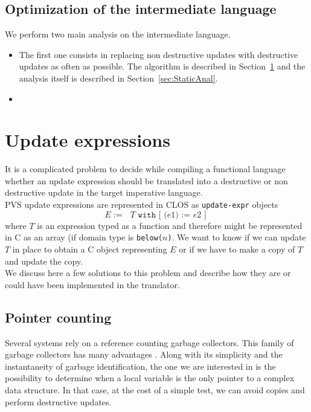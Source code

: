\documentclass[12pt,a4paper]{article}
\newcommand{\cl}[1]{\texttt{#1}}
\begin{document}
\subsection{Optimization of the intermediate language}

We perform two main analysis on the intermediate language.
\begin{itemize}
\item The first one consists in replacing non destructive updates with destructive updates as often as possible. The algorithm is described in Section~\ref{sec:UpdateExpr} and the analysis itself is described in Section~\ref{sec:StaticAnal}.
\item 
\end{itemize}



\section{Update expressions}
\label{sec:UpdateExpr}

It is a complicated problem to decide while compiling a functional language whether an update expression should be translated into a destructive or non destructive update in the target imperative language.\\

PVS update expressions are represented in CLOS as \texttt{update-expr} objects
$$ E := \cl{ $T$ with [ ($e1$) := $e2$ ] } $$
where $T$ is an expression typed as a function and therefore might be represented in C as an array (if domain type is \cl{below($n$)}.
We want to know if we can update $T$ in place to obtain a C object representing $E$ or if we have to make a copy of $T$ and update the copy.\\

We discuss here a few solutions to this problem and describe how they are or could have been implemented in the translator.

\subsection{Pointer counting}

Several systems rely on a reference counting garbage collectors. This family of garbage collectors has many advantages \cite{jonesgarbage}. Along with its simplicity and the instantaneity of garbage identification, the one we are interested in is the possibility to determine when a local variable is the only pointer to a complex data structure. In that case, at the cost of a simple test, we can avoid copies and perform destructive updates. \\
\end{document}
